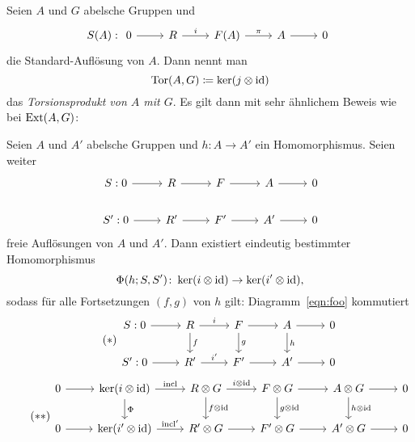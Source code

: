 \begin{defn}
  Seien $A$ und $G$ abelsche Gruppen und
  \begin{equation*}
    S(A):
    \begin{tikzcd}
      0 \arrow{r}{}
      & R \arrow{r}{i}
      & F(A) \arrow{r}{\pi}
      & A \arrow{r}{}
      & 0
    \end{tikzcd}
  \end{equation*}
  die Standard-Auflösung von $A$.
  Dann nennt man
  \begin{equation*}
    \mathrm{Tor}(A,G) \coloneqq \ker(j \otimes \operatorname{id})
  \end{equation*}
  das \emph{Torsionsprodukt von $A$ mit $G$}.
  Es gilt dann mit sehr ähnlichem Beweis wie bei $\mathrm{Ext}(A,G)$:
\end{defn}

\begin{proposition}
  Seien $A$ und $A'$ abelsche Gruppen und $h \colon A \to A'$ ein Homomorphismus.
  Seien weiter
  \begin{equation*}
    \begin{tikzcd}
      S: 0 \arrow{r}{}
      & R \arrow{r}{}
      & F \arrow{r}{}
      & A \arrow{r}{}
      & 0\\
      S': 0 \arrow{r}{}
      & R' \arrow{r}{}
      & F' \arrow{r}{}
      & A' \arrow{r}{}
      & 0
    \end{tikzcd}
  \end{equation*}
  freie Auflösungen von $A$ und $A'$.
  Dann existiert eindeutig bestimmter Homomorphismus
  \begin{equation*}
    \Phi(h; S,S') \colon \ker(i \otimes \operatorname{id}) \to \ker(i' \otimes \operatorname{id}),
  \end{equation*}
  sodass für alle Fortsetzungen $(f,g)$ von $h$ gilt:
  Diagramm~\eqref{eqn:foo} kommutiert
  \begin{equation*}
    \label{eqn:bar}
    \tag{$\ast$}
    \begin{tikzcd}
      S: 0 \arrow{r}{}
      & R \arrow{r}{i}
          \arrow{d}{f}
      & F \arrow{r}{}
          \arrow{d}{g}
      & A \arrow{r}{}
          \arrow{d}{h}
      & 0\\
      S': 0 \arrow{r}{}
      & R' \arrow{r}{i'}
      & F' \arrow{r}{}
      & A' \arrow{r}{}
      & 0
    \end{tikzcd}
  \end{equation*}
  \begin{equation*}
    \label{eqn:foo}
    \tag{$\ast\ast$}
    \begin{tikzcd}
      0 \arrow{r}{}
      & \ker(i\tensor \id) \arrow{r}{\incl}
          \arrow{d}{\Phi}
      & R \tensor G\arrow{r}{i \tensor \id}
          \arrow{d}{f \tensor \id}
      & F \tensor G \arrow{r}{}
          \arrow{d}{g \tensor \id}
      & A \tensor G \arrow{r}{}
          \arrow{d}{h \tensor \id}
      & 0\\
      0 \arrow{r}{}
      & \ker(i' \tensor \id) \arrow{r}{\incl'}
      & R' \tensor G\arrow{r}{}
      & F' \tensor G \arrow{r}{}
      & A' \tensor G \arrow{r}{}
      & 0\\
    \end{tikzcd}
  \end{equation*}
\end{proposition}

